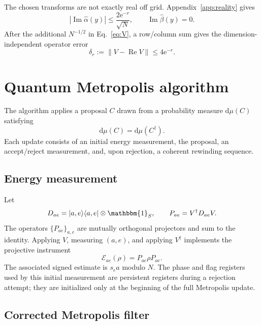 \documentclass[aps,floatfix,10pt,amssymb,amsmath,superscriptaddress,nofootinbib,longbibliography,nobalancelastpage,twocolumn]{revtex4-2}
\newcommand{\id}{\mathbbm{1}}
\newcommand{\cE}{\mathcal{E}}
\newcommand{\e}{\mathrm{e}}
\newcommand{\dd}{\mathrm{d}}
\newcommand{\ketbra}[2]{\ket{#1}\!\bra{#2}}
\begin{document}
The chosen transforms are not exactly real off grid.  Appendix~\ref{app:reality} gives
\begin{equation}
 |\operatorname{Im}\widehat\alpha(y)|\leq\frac{2\e^{-r}}{\sqrt N},
 \qquad \operatorname{Im}\widehat\beta(y)=0.
 \label{eq:reality}
\end{equation}
After the additional $N^{-1/2}$ in Eq.~\eqref{eq:V}, a row/column sum gives the dimension-independent operator error
\begin{equation}
 \delta_r:=\|V-\operatorname{Re}V\|\leq4\e^{-r}.
 \label{eq:delta-r}
\end{equation}

\section{Quantum Metropolis algorithm}
\label{sec:algorithm}

The algorithm applies a proposal $C$ drawn from a probability measure $\dd\mu(C)$ satisfying
\begin{equation}
 \dd\mu(C)=\dd\mu(C^\dagger).
 \label{eq:proposal-symmetry}
\end{equation}
Each update consists of an initial energy measurement, the proposal, an accept/reject measurement, and, upon rejection, a coherent rewinding sequence.

\subsection{Energy measurement}

Let
\begin{equation}
 D_{ae}=\ketbra{a,e}{a,e}\otimes\id_S,
 \qquad P_{ae}=V^\dagger D_{ae}V.
 \label{eq:energy-projector}
\end{equation}
The operators $\{P_{ae}\}_{a,e}$ are mutually orthogonal projectors and sum to the identity.  Applying $V$, measuring $(a,e)$, and applying $V^\dagger$ implements the projective instrument
\begin{equation}
 \cE_{ae}(\rho)=P_{ae}\rho P_{ae}.
 \label{eq:energy-instrument}
\end{equation}
The associated signed estimate is $s_ea$ modulo $N$.  The phase and flag registers used by this initial measurement are persistent registers during a rejection attempt; they are initialized only at the beginning of the full Metropolis update.

\subsection{Corrected Metropolis filter}
\end{document}
